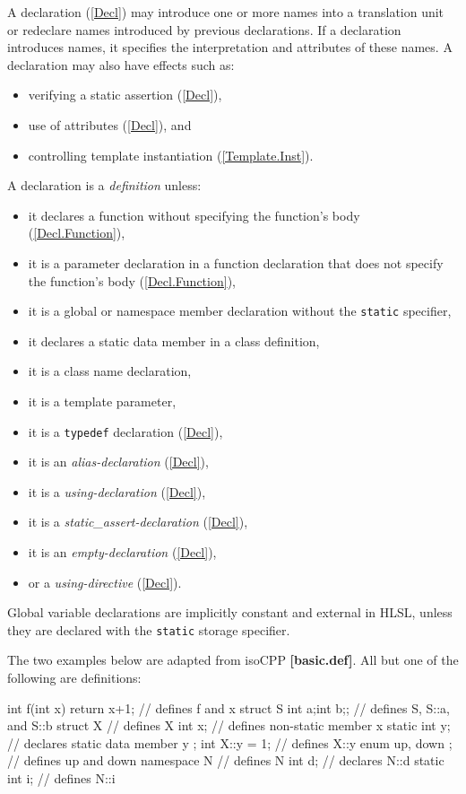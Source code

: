 \p A declaration (\ref{Decl}) may introduce one or more names into a translation
unit or redeclare names introduced by previous declarations. If a declaration
introduces names, it specifies the interpretation and attributes of these names.
A declaration may also have effects such as:
\begin{itemize}
\item verifying a static assertion (\ref{Decl}),
\item use of attributes (\ref{Decl}), and
\item controlling template instantiation (\ref{Template.Inst}).
\end{itemize}

\p A declaration is a \textit{definition} unless:
\begin{itemize}
\item it declares a function without specifying the function's body
(\ref{Decl.Function}),
\item it is a parameter declaration in a function declaration that does not
specify the function's body (\ref{Decl.Function}),
\item it is a global or namespace member declaration without the \texttt{static}
specifier,
\item it declares a static data member in a class definition,
\item it is a class name declaration,
\item it is a template parameter,
\item it is a \texttt{typedef} declaration (\ref{Decl}),
\item it is an \textit{alias-declaration} (\ref{Decl}),
\item it is a \textit{using-declaration} (\ref{Decl}),
\item it is a \textit{static\_assert-declaration} (\ref{Decl}),
\item it is an \textit{empty-declaration} (\ref{Decl}),
\item or a \textit{using-directive} (\ref{Decl}).
\end{itemize}

\begin{note}
  Global variable declarations are implicitly constant and external in HLSL,
  unless they are declared with the \texttt{static} storage specifier.
\end{note}

\p The two examples below are adapted from \gls{isoCPP} \textbf{[basic.def]}. All
but one of the following are definitions:
\begin{HLSL}
int f(int x) { return x+1; } // defines f and x
struct S {int a;int b;};     // defines S, S::a, and S::b
struct X {                   // defines X
  int x;                     // defines non-static member x
  static int y;              // declares static data member y
};
int X::y = 1;                // defines X::y
enum { up, down };           // defines up and down
namespace N {                // defines N
int d;                       // declares N::d
static int i;                // defines N::i
}
\end{HLSL}

